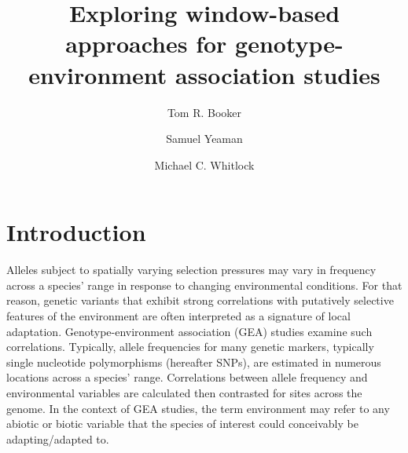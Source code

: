 \documentclass[11pt,twoside,lineno]{GSA_format}
\title{Exploring window-based approaches for genotype-environment association studies}
\author[$\ast$]{Tom R. Booker}
\author[$\dagger$]{Samuel Yeaman}
\author[$\ast$]{Michael C. Whitlock}
\affil[$\ast$]{University of British Columbia}
\affil[$\dagger$]{University of Calgary}
\begin{document}
\maketitle
\marginmark
\firstpagefootnote

\vspace{-33pt}%

\section{Introduction}


Alleles subject to spatially varying selection pressures may vary in frequency across a species' range in response to changing environmental conditions. For that reason, genetic variants that exhibit strong correlations with putatively selective features of the environment are often interpreted as a signature of local adaptation. Genotype-environment association (GEA) studies examine such correlations. Typically, allele frequencies for many genetic markers, typically single nucleotide polymorphisms (hereafter SNPs), are estimated in numerous locations across a species' range. Correlations between allele frequency and environmental variables are calculated then contrasted for sites across the genome. In the context of GEA studies, the term environment may refer to any abiotic or biotic variable that the species of interest could conceivably be adapting/adapted to. \\
\end{document}
